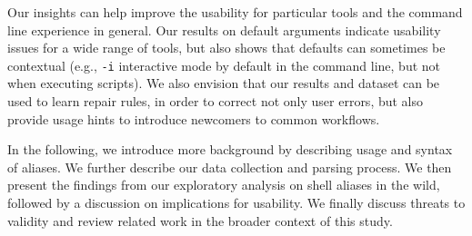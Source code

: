 \TODO Our insights can help improve the usability for particular tools and the command line experience in general.
Our results on default arguments indicate usability issues for a wide range of tools, but also shows that defaults can sometimes be contextual (e.g., \verb|-i| interactive mode by default in the command line, but not when executing scripts).
We also envision that our results and dataset can be used to learn repair rules, in order to correct not only user errors, but also provide usage hints to introduce newcomers to common workflows.

In the following, we introduce more background by describing usage and syntax of aliases. We further describe our data collection and parsing process. We then present the findings from our exploratory analysis on shell aliases in the wild, followed by a discussion on implications for usability. We finally discuss threats to validity and review related work in the broader context of this study. 